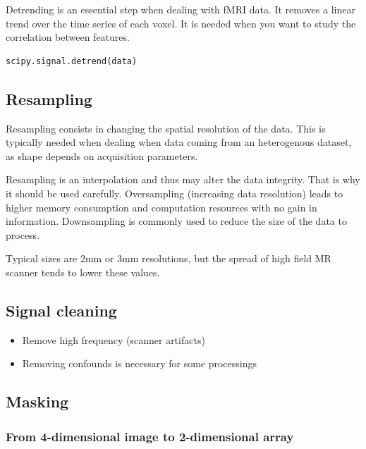 \documentclass{frontiersSCNS} %
\begin{document}
Detrending is an essential step when dealing with fMRI data. It removes a
linear trend over the time series of each
voxel. It is needed when you want to study the correlation between
features.

\begin{lstlisting}
scipy.signal.detrend(data)
\end{lstlisting}

\subsection{Resampling}

Resampling consists in changing the spatial resolution of the data. This is
typically needed
when dealing when data coming from an heterogenous dataset, as shape depends
on acquisition parameters.

Resampling is an interpolation and thus may alter the data integrity. That is
why it should be used carefully. Oversampling (increasing
data resolution) leads to higher memory consumption and computation resources
with no gain in information.
Downsampling is commonly used to reduce the size of the data to process.

Typical sizes are 2mm or 3mm resolutions, but the spread of high field MR
scanner tends to lower these values.

\subsection{Signal cleaning}

\begin{itemize}
    \item Remove high frequency (scanner artifacts)
    \item Removing confounds is necessary for some processings
\end{itemize}



\subsection{Masking}


\subsubsection{From 4-dimensional image to 2-dimensional array}
\end{document}
